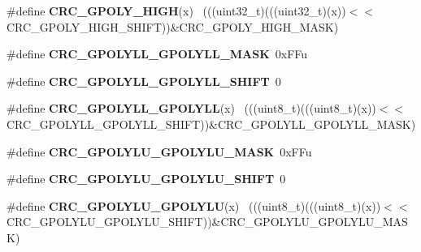 \begin{DoxyCompactItemize}
\item 
\hypertarget{group___c_r_c___register___masks_ga90a11ee1325340cc0d7e18d791814a36}{}\#define {\bfseries C\+R\+C\+\_\+\+G\+P\+O\+L\+Y\+\_\+\+H\+I\+G\+H}(x)                                            ~(((uint32\+\_\+t)(((uint32\+\_\+t)(x))$<$$<$C\+R\+C\+\_\+\+G\+P\+O\+L\+Y\+\_\+\+H\+I\+G\+H\+\_\+\+S\+H\+I\+F\+T))\&C\+R\+C\+\_\+\+G\+P\+O\+L\+Y\+\_\+\+H\+I\+G\+H\+\_\+\+M\+A\+S\+K)\label{group___c_r_c___register___masks_ga90a11ee1325340cc0d7e18d791814a36}

\item 
\hypertarget{group___c_r_c___register___masks_ga659c987f1e9d74e32d16e4b69bd763ee}{}\#define {\bfseries C\+R\+C\+\_\+\+G\+P\+O\+L\+Y\+L\+L\+\_\+\+G\+P\+O\+L\+Y\+L\+L\+\_\+\+M\+A\+S\+K}~0x\+F\+Fu\label{group___c_r_c___register___masks_ga659c987f1e9d74e32d16e4b69bd763ee}

\item 
\hypertarget{group___c_r_c___register___masks_ga1a323693acd9a37bb90abdc7f16ebbd8}{}\#define {\bfseries C\+R\+C\+\_\+\+G\+P\+O\+L\+Y\+L\+L\+\_\+\+G\+P\+O\+L\+Y\+L\+L\+\_\+\+S\+H\+I\+F\+T}~0\label{group___c_r_c___register___masks_ga1a323693acd9a37bb90abdc7f16ebbd8}

\item 
\hypertarget{group___c_r_c___register___masks_ga2ee0f77533aefa75692a541b5eac2a1b}{}\#define {\bfseries C\+R\+C\+\_\+\+G\+P\+O\+L\+Y\+L\+L\+\_\+\+G\+P\+O\+L\+Y\+L\+L}(x)                                  ~(((uint8\+\_\+t)(((uint8\+\_\+t)(x))$<$$<$C\+R\+C\+\_\+\+G\+P\+O\+L\+Y\+L\+L\+\_\+\+G\+P\+O\+L\+Y\+L\+L\+\_\+\+S\+H\+I\+F\+T))\&C\+R\+C\+\_\+\+G\+P\+O\+L\+Y\+L\+L\+\_\+\+G\+P\+O\+L\+Y\+L\+L\+\_\+\+M\+A\+S\+K)\label{group___c_r_c___register___masks_ga2ee0f77533aefa75692a541b5eac2a1b}

\item 
\hypertarget{group___c_r_c___register___masks_gaf2e9b900f7d964512e1541299729abb9}{}\#define {\bfseries C\+R\+C\+\_\+\+G\+P\+O\+L\+Y\+L\+U\+\_\+\+G\+P\+O\+L\+Y\+L\+U\+\_\+\+M\+A\+S\+K}~0x\+F\+Fu\label{group___c_r_c___register___masks_gaf2e9b900f7d964512e1541299729abb9}

\item 
\hypertarget{group___c_r_c___register___masks_ga4d6303422fb112dfad558ee2f84aa92c}{}\#define {\bfseries C\+R\+C\+\_\+\+G\+P\+O\+L\+Y\+L\+U\+\_\+\+G\+P\+O\+L\+Y\+L\+U\+\_\+\+S\+H\+I\+F\+T}~0\label{group___c_r_c___register___masks_ga4d6303422fb112dfad558ee2f84aa92c}

\item 
\hypertarget{group___c_r_c___register___masks_gae056d7d15c0caa312e768f34d89085bb}{}\#define {\bfseries C\+R\+C\+\_\+\+G\+P\+O\+L\+Y\+L\+U\+\_\+\+G\+P\+O\+L\+Y\+L\+U}(x)                                  ~(((uint8\+\_\+t)(((uint8\+\_\+t)(x))$<$$<$C\+R\+C\+\_\+\+G\+P\+O\+L\+Y\+L\+U\+\_\+\+G\+P\+O\+L\+Y\+L\+U\+\_\+\+S\+H\+I\+F\+T))\&C\+R\+C\+\_\+\+G\+P\+O\+L\+Y\+L\+U\+\_\+\+G\+P\+O\+L\+Y\+L\+U\+\_\+\+M\+A\+S\+K)\label{group___c_r_c___register___masks_gae056d7d15c0caa312e768f34d89085bb}


\end{DoxyCompactItemize}
